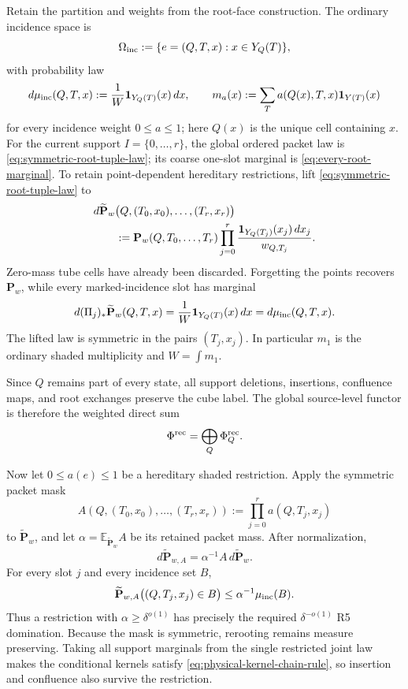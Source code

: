 \documentclass[11pt]{article}
\begin{document}
Retain the partition and weights from the root-face construction.
The ordinary incidence space is
\[
 \Omega_{\rm inc}
 :=\{e=(Q,T,x):x\in Y_Q(T)\},
\]
with probability law
\begin{equation}\label{eq:ordinary-incidence-atom-law}
 d\mu_{\rm inc}(Q,T,x)
 :=\frac1W{\bf1}_{Y_Q(T)}(x)\,dx,
 \qquad
 m_a(x):=\sum_Ta(Q(x),T,x){\bf1}_{Y(T)}(x)
\end{equation}
for every incidence weight \(0\le a\le1\); here \(Q(x)\) is the unique cell
containing \(x\).  For the current support \(I=\{0,\ldots,r\}\), the global
ordered packet law is \eqref{eq:symmetric-root-tuple-law}; its coarse
one-slot marginal is \eqref{eq:every-root-marginal}.
To retain point-dependent hereditary restrictions, lift
\eqref{eq:symmetric-root-tuple-law} to
\begin{equation}\label{eq:global-lifted-incidence-packet-law}
 \begin{aligned}
 &d\widetilde{\mathbf P}_w
 \bigl(Q,(T_0,x_0),\ldots,(T_r,x_r)\bigr)\\
 &\qquad:=
 \mathbf P_w(Q,T_0,\ldots,T_r)
 \prod_{j=0}^r
 \frac{{\bf1}_{Y_Q(T_j)}(x_j)\,dx_j}{w_{Q,T_j}}.
 \end{aligned}
\end{equation}
Zero-mass tube cells have already been discarded.  Forgetting the points
recovers \(\mathbf P_w\), while every marked-incidence slot has marginal
\begin{equation}\label{eq:global-incidence-slot-marginal}
 d(\Pi_j)_*\widetilde{\mathbf P}_w(Q,T,x)
 =\frac1W{\bf1}_{Y_Q(T)}(x)\,dx
 =d\mu_{\rm inc}(Q,T,x).
\end{equation}
The lifted law is symmetric in the pairs \((T_j,x_j)\).  In particular
\(m_1\) is the ordinary shaded multiplicity and \(W=\int m_1\).

Since \(Q\) remains part of every state, all support deletions, insertions,
confluence maps, and root exchanges preserve the cube label.  The global
source-level functor is therefore the weighted direct sum
\begin{equation}\label{eq:global-local-fsc-sum}
 \Phi^{\rm rec}
 =\bigoplus_Q\Phi_Q^{\rm rec}.
\end{equation}

Now let \(0\le a(e)\le1\) be a hereditary shaded restriction.  Apply the
symmetric packet mask
\[
 A(Q,(T_0,x_0),\ldots,(T_r,x_r))
 :=\prod_{j=0}^r a(Q,T_j,x_j)
\]
to \(\widetilde{\mathbf P}_w\), and let
\(\alpha=\mathbb E_{\widetilde{\mathbf P}_w}A\) be its retained packet mass.  After
normalization,
\[
 d\widetilde{\mathbf P}_{w,A}
 =\alpha^{-1}A\,d\widetilde{\mathbf P}_w.
\]
For every slot \(j\) and every incidence set \(B\),
\begin{equation}\label{eq:global-restriction-rn}
 \widetilde{\mathbf P}_{w,A}\bigl((Q,T_j,x_j)\in B\bigr)
 \le
 \alpha^{-1}\mu_{\rm inc}(B).
\end{equation}
Thus a restriction with \(\alpha\ge\delta^{o(1)}\) has precisely the required
\(\delta^{-o(1)}\) R5 domination.  Because the mask is symmetric, rerooting
remains measure preserving.  Taking all support marginals from the single
restricted joint law makes the conditional kernels satisfy
\eqref{eq:physical-kernel-chain-rule}, so insertion and confluence also survive
the restriction.
\end{document}
